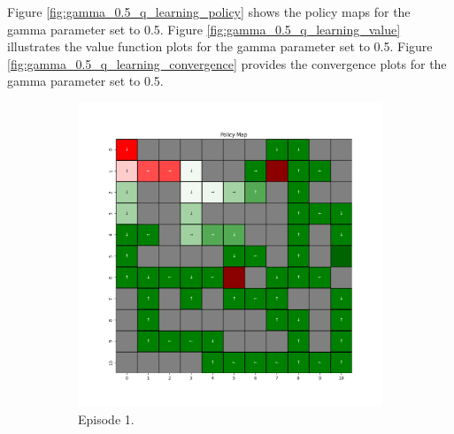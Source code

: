 \documentclass{assignment}
\begin{document}
Figure \ref{fig:gamma_0.5_q_learning_policy} shows the policy maps for the gamma parameter set to 0.5. Figure \ref{fig:gamma_0.5_q_learning_value} illustrates the value function plots for the gamma parameter set to 0.5. Figure \ref{fig:gamma_0.5_q_learning_convergence} provides the convergence plots for the gamma parameter set to 0.5.

\begin{figure}[H]
    \begin{subfigure}{0.3\textwidth}
        \includegraphics[width=\textwidth]{figures/policy_q/gamma_sweep/policy_alpha_0.1_gamma_0.5_epsilon_0.2_iteration_1.png}
    \caption{Episode 1.}
    \end{subfigure}\hfill
    \begin{subfigure}{0.3\textwidth}

\end{subfigure}
\end{figure}
\end{document}
